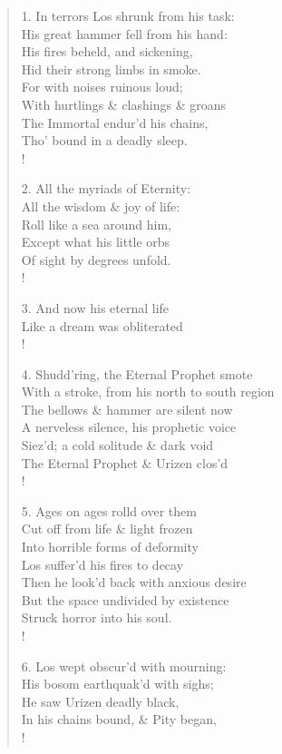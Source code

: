 \documentclass[9pt]{extarticle}
\begin{document}
\begin{verse}
\begin{altverse} 
		
		1. In terrors Los shrunk from his task:\\
		His great hammer fell from his hand:\\
		His fires beheld, and sickening,\\
		Hid their strong limbs in smoke.\\
		For with noises ruinous loud;\\
		With hurtlings \& clashings \& groans\\
		The Immortal endur'd his chains,\\
		Tho' bound in a deadly sleep.\\!
		
		2. All the myriads of Eternity:\\
		All the wisdom \& joy of life:\\
		Roll like a sea around him,\\
		Except what his little orbs\\
		Of sight by degrees unfold.\\!
		
		3. And now his eternal life\\
		Like a dream was obliterated\\!
		
		4. Shudd'ring, the Eternal Prophet smote\\
		With a stroke, from his north to south region\\
		The bellows \& hammer are silent now\\
		A nerveless silence, his prophetic voice\\
		Siez'd; a cold solitude \& dark void\\
		The Eternal Prophet \& Urizen clos'd\\!
		
		5. Ages on ages rolld over them\\
		Cut off from life \& light frozen\\
		Into horrible forms of deformity\\
		Los suffer'd his fires to decay\\
		Then he look'd back with anxious desire\\
		But the space undivided by existence\\
		Struck horror into his soul.\\!
		
		6. Los wept obscur'd with mourning:\\
		His bosom earthquak'd with sighs;\\
		He saw Urizen deadly black,\\
		In his chains bound, \& Pity began,\\!
		

\end{altverse}
\end{verse}
\end{document}
